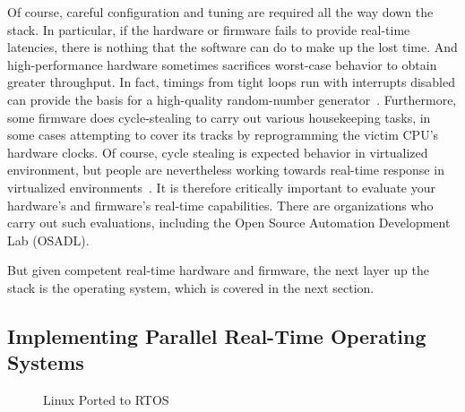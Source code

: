 Of course, careful configuration and tuning are required all the way down
the stack.
In particular, if the hardware or firmware fails to provide real-time
latencies, there is nothing that the software can do to make up the
lost time.
And high-performance hardware sometimes sacrifices worst-case behavior
to obtain greater throughput.
In fact, timings from tight loops run with interrupts disabled can
provide the basis for a high-quality random-number
generator~\cite{PeterOkech2009InherentRandomness}.
Furthermore, some firmware does cycle-stealing to carry out various
housekeeping tasks, in some cases attempting to cover its tracks by
reprogramming the victim CPU's hardware clocks.
Of course, cycle stealing is expected behavior in virtualized
environment, but people are nevertheless working towards real-time
response in virtualized
environments~\cite{ThomasGleixner2012KVMrealtime,JanKiszka2014virtRT}.
It is therefore critically important to evaluate your hardware's and
firmware's real-time capabilities.
There are organizations who carry out such evaluations, including
the Open Source Automation Development Lab (OSADL).

But given competent real-time hardware and firmware, the next
layer up the stack is the operating system, which is covered in
the next section.

\subsection{Implementing Parallel Real-Time Operating Systems}
\label{sec:advsync:Implementing Parallel Real-Time Operating Systems}

\begin{figure}[tb]
\centering
{}
\caption{Linux Ported to RTOS}
\label{fig:advsync:Linux Ported to RTOS}
\end{figure}

